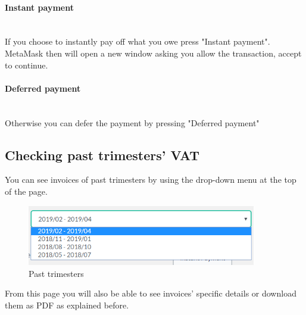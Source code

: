 	\paragraph{Instant payment} \mbox{}\\
	If you choose to instantly pay off what you owe press "Instant 
	payment". MetaMask then will open a new window asking you allow the 
	transaction, accept to continue.
	\paragraph{Deferred payment} \mbox{}\\
	Otherwise you can defer the payment by pressing "Deferred payment" 
	\subsection{Checking past trimesters' VAT}
	You can see invoices of past trimesters by using the drop-down 
	menu at the top of the page.
	\begin{figure}[H]
		\includegraphics[width=10cm]{res/images/past_trimesters.png}
		\centering
		\caption{Past trimesters}
	\end{figure}
	\noindent From this page you will also be able to see invoices' specific 
	details or download them as PDF as explained before.